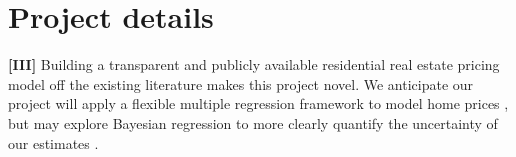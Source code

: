 \documentclass[sigconf,nonacm,11pt]{acmart}
\begin{document}
\section{Project details}

\textbf{[III]}
Building a transparent and publicly available residential real estate pricing model off the existing literature makes this project novel. We anticipate our project will apply a flexible multiple regression framework to model home prices \cite{James2014} \cite{James2014:LinearRegression}, but may explore Bayesian regression to more clearly quantify the uncertainty of our estimates \cite{Gelman2014:BayesianLinReg}. 



\end{document}
